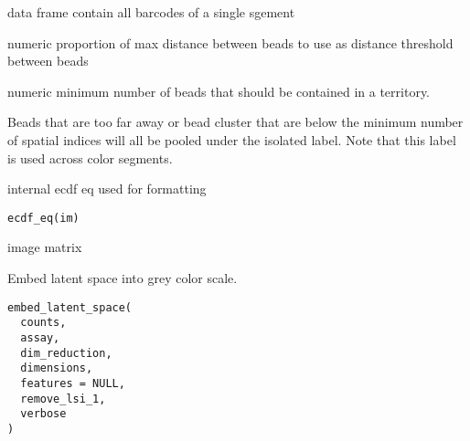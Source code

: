 \documentclass[a4paper]{book}
\begin{document}
%
\begin{Arguments}
\begin{ldescription}
\item[\code{img}] data frame contain all barcodes of a single sgement

\item[\code{capture\_radius}] numeric proportion of max distance between beads
to use as distance threshold between beads

\item[\code{min\_spatial\_index}] numeric minimum number of beads that should
be contained in a territory.
\end{ldescription}
\end{Arguments}
%
\begin{Details}
Beads that are too far away or bead cluster that are below
the minimum number of spatial indices will all be pooled under the
isolated label. Note that this label is used across color segments.
\end{Details}
%
\begin{Description}
internal ecdf eq 
used for formatting
\end{Description}
%
\begin{Usage}
\begin{verbatim}
ecdf_eq(im)
\end{verbatim}
\end{Usage}
%
\begin{Arguments}
\begin{ldescription}
\item[\code{im}] image matrix
\end{ldescription}
\end{Arguments}
%
\begin{Description}
Embed latent space into grey color scale.
\end{Description}
%
\begin{Usage}
\begin{verbatim}
embed_latent_space(
  counts,
  assay,
  dim_reduction,
  dimensions,
  features = NULL,
  remove_lsi_1,
  verbose
)
\end{verbatim}
\end{Usage}
%
\end{document}
